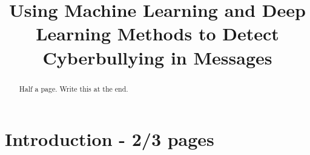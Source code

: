 \documentclass[12pt,a4paper]{article}
\title{Using Machine Learning and Deep Learning Methods to Detect Cyberbullying in Messages}
\author{} %
\date{}
\begin{document}
\maketitle


 


\begin{abstract}
Half a page. Write this at the end.
\end{abstract}

\begin{keywords}
\end{keywords}



\section{Introduction - 2/3 pages}
\end{document}
